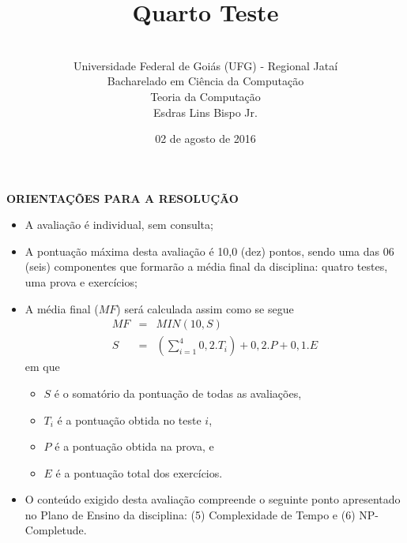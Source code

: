 \documentclass[12pt,a4paper,oneside]{article}
\author{\\Universidade Federal de Goiás (UFG) - Regional Jataí \\Bacharelado em Ciência da Computação \\Teoria da Computação \\Esdras Lins Bispo Jr.}
\date{02 de agosto de 2016}
\title{\sc \huge Quarto Teste}
\begin{document}
\maketitle

{\bf ORIENTAÇÕES PARA A RESOLUÇÃO}

\begin{itemize}
	\item A avaliação é individual, sem consulta;
	\item A pontuação máxima desta avaliação é 10,0 (dez) pontos, sendo uma das 06 (seis) componentes que formarão a média final da disciplina: quatro testes, uma prova e exercícios;
	\item A média final ($MF$) será calculada assim como se segue
	\begin{eqnarray}
		MF & = & MIN(10, S) \nonumber \\
		S & = & (\sum_{i=1}^{4} 0,2.T_i ) + 0,2.P  + 0,1.E \nonumber
	\end{eqnarray}
	em que 
	\begin{itemize}
		\item $S$ é o somatório da pontuação de todas as avaliações,
		\item $T_i$ é a pontuação obtida no teste $i$,
		\item $P$ é a pontuação obtida na prova, e
		\item $E$ é a pontuação total dos exercícios.
	\end{itemize}
	\item O conteúdo exigido desta avaliação compreende o seguinte ponto apresentado no Plano de Ensino da disciplina: (5) Complexidade de Tempo e (6) NP-Completude.
\end{itemize}

\begin{center}
\end{center}

\newpage
\end{document}
